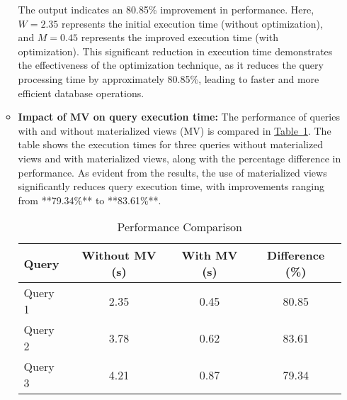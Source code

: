 \begin{enumerate}
\begin{itemize}


\begin{comment}\[
\text{Difference (\%)} = \frac{\text{Without MV} - \text{With MV}}{\text{Without MV}} \times 100 = \frac{2.35 - 0.45}{2.35} \times 100 \approx 80.85\%
\]
\end{comment}

The output indicates an 80.85\% improvement in performance. Here, \( W = 2.35 \) represents the initial execution time (without optimization), and \( M = 0.45 \) represents the improved execution time (with optimization). This significant reduction in execution time demonstrates the effectiveness of the optimization technique, as it reduces the query processing time by approximately 80.85\%, leading to faster and more efficient database operations.\vspace{.4cm}

\item \textbf{Impact of MV on query execution time:} The performance of queries with and without materialized views (MV) is compared in \hyperref[tab:performance]{Table~\ref*{tab:performance}}. The table shows the execution times for three queries without materialized views and with materialized views, along with the percentage difference in performance. As evident from the results, the use of materialized views significantly reduces query execution time, with improvements ranging from **79.34\%** to **83.61\%**.

\begin{table}[h!]
    \centering
    \caption{Performance Comparison}
    \label{tab:performance}
    \begin{tabular}{lccc}
        \toprule
        \rowcolor{blue!10} %
        \textbf{Query} & \textbf{Without MV (s)} & \textbf{With MV (s)} & \textbf{Difference (\%)} \\
        \midrule
        Query 1 & 2.35 & 0.45 & \cellcolor{white!20}80.85 \\
        Query 2 & 3.78 & 0.62 & \cellcolor{gray!10}83.61 \\
        Query 3 & 4.21 & 0.87 & \cellcolor{white!20}79.34 \\
        \bottomrule
    \end{tabular}
\end{table}





\end{itemize}
\end{enumerate}
